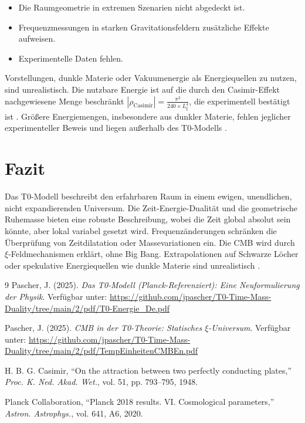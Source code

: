\documentclass[12pt,a4paper]{report}
\begin{document}
\begin{itemize}
	\item Die Raumgeometrie in extremen Szenarien nicht abgedeckt ist.
	\item Frequenzmessungen in starken Gravitationsfeldern zusätzliche Effekte aufweisen.
	\item Experimentelle Daten fehlen.
\end{itemize}

\begin{critical}
	Vorstellungen, dunkle Materie oder Vakuumenergie als Energiequellen zu nutzen, sind unrealistisch. Die nutzbare Energie ist auf die durch den Casimir-Effekt nachgewiesene Menge beschränkt 
	\( |\rho_{\text{Casimir}}| = \frac{\pi^2}{240 \times L_\xi^4} \), die experimentell bestätigt ist \cite{Casimir1948}. 
	Größere Energiemengen, insbesondere aus dunkler Materie, fehlen jeglicher experimenteller Beweis und liegen außerhalb des T0-Modells \cite{pascher_t0_energie_2025}.
\end{critical}

\section{Fazit}
\label{sec:fazit}

Das T0-Modell beschreibt den erfahrbaren Raum in einem ewigen, unendlichen, nicht expandierenden Universum. Die Zeit-Energie-Dualität und die geometrische Ruhemasse bieten eine robuste Beschreibung, wobei die Zeit global absolut sein könnte, aber lokal variabel gesetzt wird. Frequenzänderungen schränken die Überprüfung von Zeitdilatation oder Massevariationen ein. Die CMB wird durch \(\xi\)-Feldmechanismen erklärt, ohne Big Bang. Extrapolationen auf Schwarze Löcher oder spekulative Energiequellen wie dunkle Materie sind unrealistisch \cite{pascher_t0_energie_2025}.

\begin{thebibliography}{9}
	Pascher, J. (2025). \textit{Das T0-Modell (Planck-Referenziert): Eine Neuformulierung der Physik}. 
	Verfügbar unter: \url{https://github.com/jpascher/T0-Time-Mass-Duality/tree/main/2/pdf/T0-Energie_De.pdf}
	
	Pascher, J. (2025). \textit{CMB in der T0-Theorie: Statisches \(\xi\)-Universum}. 
	Verfügbar unter: \url{https://github.com/jpascher/T0-Time-Mass-Duality/tree/main/2/pdf/TempEinheitenCMBEn.pdf}
	
	H. B. G. Casimir, ``On the attraction between two perfectly conducting plates,'' \emph{Proc. K. Ned. Akad. Wet.}, vol. 51, pp. 793--795, 1948.
	
	Planck Collaboration, ``Planck 2018 results. VI. Cosmological parameters,'' \emph{Astron. Astrophys.}, vol. 641, A6, 2020.
\end{thebibliography}
\end{document}
